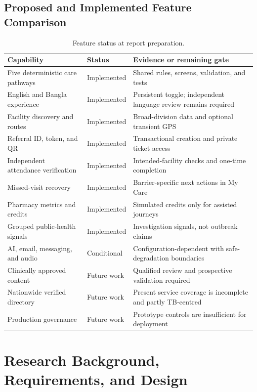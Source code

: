 \documentclass[12pt,onecolumn]{IEEEtran}
\begin{document}
\subsection{Proposed and Implemented Feature Comparison}
\begin{table}[H]
\caption{Feature status at report preparation.}\label{tab:feature-status}\centering\small
\begin{tabularx}{\textwidth}{p{}p{}X}
\toprule Capability & Status & Evidence or remaining gate \\\midrule
Five deterministic care pathways & Implemented & Shared rules, screens, validation, and tests \\
English and Bangla experience & Implemented & Persistent toggle; independent language review remains required \\
Facility discovery and routes & Implemented & Broad-division data and optional transient GPS \\
Referral ID, token, and QR & Implemented & Transactional creation and private ticket access \\
Independent attendance verification & Implemented & Intended-facility checks and one-time completion \\
Missed-visit recovery & Implemented & Barrier-specific next actions in My Care \\
Pharmacy metrics and credits & Implemented & Simulated credits only for assisted journeys \\
Grouped public-health signals & Implemented & Investigation signals, not outbreak claims \\
AI, email, messaging, and audio & Conditional & Configuration-dependent with safe-degradation boundaries \\
Clinically approved content & Future work & Qualified review and prospective validation required \\
Nationwide verified directory & Future work & Present service coverage is incomplete and partly TB-centred \\
Production governance & Future work & Prototype controls are insufficient for deployment \\
\bottomrule
\end{tabularx}
\end{table}

\section{Research Background, Requirements, and Design}
\end{document}
